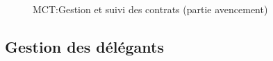 \documentclass[a4paper]{report}
\begin{document}
\begin{doublespace}
	\begin{figure}[H]
		\begin{center}
			\caption{MCT:Gestion et suivi des contrats (partie avencement)}
		\end{center}
	\end{figure}

	\subsection{Gestion des délégants}


\end{doublespace}
\end{document}
